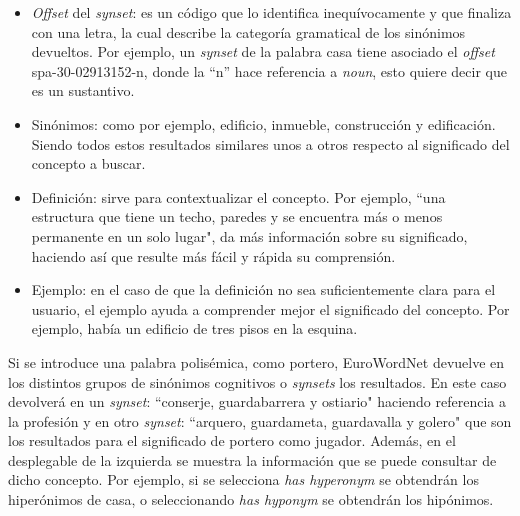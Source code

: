 

\begin{itemize}
	
	\item \textit{Offset} del \textit{synset}: es un código que lo identifica inequívocamente y que finaliza con una letra, la cual describe la categoría gramatical de los sinónimos devueltos. Por ejemplo, un \textit{synset} de la palabra casa tiene asociado el \textit{offset} spa-30-02913152-n, donde la ``n'' hace referencia a \textit{noun}, esto quiere decir que es un sustantivo. 
	\item Sinónimos: como por ejemplo, edificio, inmueble, construcción y edificación. Siendo todos estos resultados similares unos a otros respecto al significado del concepto a buscar.
	\item Definición: sirve para contextualizar el concepto. Por ejemplo, ``una estructura que tiene un techo, paredes y se encuentra más o menos permanente en un solo lugar", da más información sobre su significado, haciendo así que resulte más fácil y rápida su comprensión.
	\item Ejemplo: en el caso de que la definición no sea suficientemente clara para el usuario, el ejemplo ayuda a comprender mejor el significado del concepto. Por ejemplo, había un edificio de tres pisos en la esquina. 
\end{itemize} 

Si se introduce una palabra polisémica, como portero, EuroWordNet devuelve en los distintos grupos de sinónimos cognitivos o \textit{synsets} los resultados. En este caso devolverá en un \textit{synset}: ``conserje, guardabarrera y ostiario" \hspace{1pt} haciendo referencia a la profesión y en otro \textit{synset}: ``arquero, guardameta, guardavalla y golero" que son los resultados para el significado de portero como jugador. 
Además, en el desplegable de la izquierda se muestra la información que se puede consultar de dicho concepto. Por ejemplo, si se selecciona \textit{has hyperonym} se obtendrán los hiperónimos de casa, o seleccionando \textit{has hyponym} se obtendrán los hipónimos.



